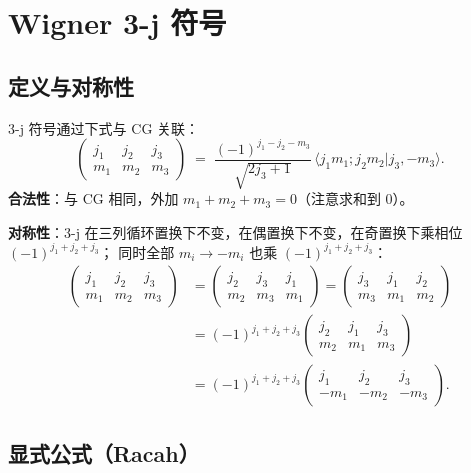\section{Wigner 3-j 符号}
\label{sec:appB_3j}

\subsection{定义与对称性}

3-j 符号通过下式与 CG 关联：
\begin{equation}
\begin{pmatrix} j_1 & j_2 & j_3 \\ m_1 & m_2 & m_3 \end{pmatrix}
\;=\;
\frac{(-1)^{j_1 - j_2 - m_3}}{\sqrt{2 j_3 + 1}}\,
\langle j_1 m_1; j_2 m_2 | j_3, -m_3 \rangle.
\label{eq:appB_3j_to_CG}
\end{equation}
\textbf{合法性}：与 CG 相同，外加 $m_1 + m_2 + m_3 = 0$（注意求和到 0）。

\textbf{对称性}：3-j 在三列循环置换下不变，在偶置换下不变，在奇置换下乘相位 $(-1)^{j_1+j_2+j_3}$；
同时全部 $m_i\to -m_i$ 也乘 $(-1)^{j_1+j_2+j_3}$：
\begin{align}
\begin{pmatrix} j_1 & j_2 & j_3 \\ m_1 & m_2 & m_3 \end{pmatrix}
&=
\begin{pmatrix} j_2 & j_3 & j_1 \\ m_2 & m_3 & m_1 \end{pmatrix}
=
\begin{pmatrix} j_3 & j_1 & j_2 \\ m_3 & m_1 & m_2 \end{pmatrix} \\
&= (-1)^{j_1+j_2+j_3}
\begin{pmatrix} j_2 & j_1 & j_3 \\ m_2 & m_1 & m_3 \end{pmatrix} \\
&= (-1)^{j_1+j_2+j_3}
\begin{pmatrix} j_1 & j_2 & j_3 \\ -m_1 & -m_2 & -m_3 \end{pmatrix}.
\end{align}

\subsection{显式公式（Racah）}

